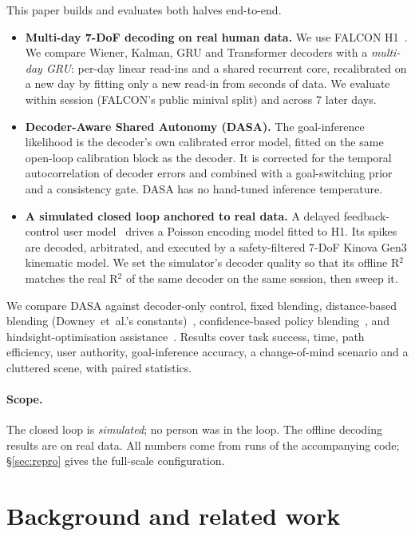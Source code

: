 This paper builds and evaluates both halves end-to-end.
\begin{itemize}
\item \textbf{Multi-day 7-DoF decoding on real human data.} We use FALCON
  H1~\cite{karpowicz2024falcon}. We compare Wiener, Kalman, GRU and Transformer
  decoders with a \emph{multi-day GRU}: per-day linear read-ins and a shared recurrent
  core, recalibrated on a new day by fitting only a new read-in from seconds of data.
  We evaluate within session (FALCON's public minival split) and across 7 later days.
\item \textbf{Decoder-Aware Shared Autonomy (DASA).} The goal-inference likelihood is
  the decoder's own calibrated error model, fitted on the same open-loop calibration
  block as the decoder. It is corrected for the temporal autocorrelation of decoder
  errors and combined with a goal-switching prior and a consistency gate. DASA has no
  hand-tuned inference temperature.
\item \textbf{A simulated closed loop anchored to real data.} A delayed
  feedback-control user model~\cite{cunningham2011closed,willett2017feedback} drives a
  Poisson encoding model fitted to H1. Its spikes are decoded, arbitrated, and
  executed by a safety-filtered 7-DoF Kinova Gen3 kinematic model. We set the
  simulator's decoder quality so that its offline R$^2$ matches the real R$^2$ of the
  same decoder on the same session, then sweep it.
\end{itemize}

We compare DASA against decoder-only control, fixed blending, distance-based blending
(Downey~et~al.'s constants)~\cite{downey2016blending}, confidence-based policy
blending~\cite{dragan2013policy}, and hindsight-optimisation
assistance~\cite{javdani2015shared}. Results cover task success, time, path efficiency,
user authority, goal-inference accuracy, a change-of-mind scenario and a cluttered
scene, with paired statistics.

\paragraph{Scope.} The closed loop is \emph{simulated}; no person was in the loop. The
offline decoding results are on real data. All numbers come from runs of the
accompanying code; \S\ref{sec:repro} gives the full-scale configuration.

\section{Background and related work}
